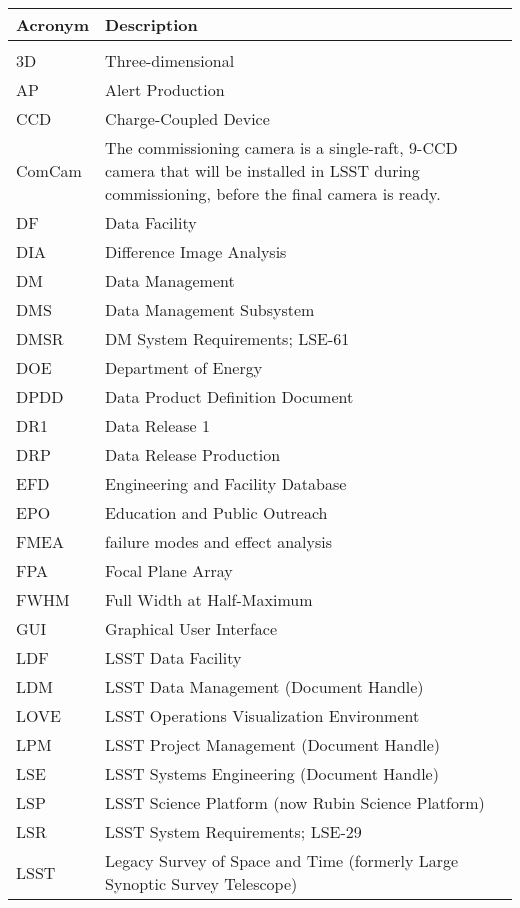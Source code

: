 \addtocounter{table}{-1}
\begin{longtable}{p{}p{}}\hline
\textbf{Acronym} & \textbf{Description}  \\\hline

 &  \\\hline
3D & Three-dimensional \\\hline
AP & Alert Production \\\hline
CCD & Charge-Coupled Device \\\hline
ComCam & The commissioning camera is a single-raft, 9-CCD camera that will be installed in LSST during commissioning, before the final camera is ready. \\\hline
DF & Data Facility \\\hline
DIA & Difference Image Analysis \\\hline
DM & Data Management \\\hline
DMS & Data Management Subsystem \\\hline
DMSR & DM System Requirements; LSE-61 \\\hline
DOE & Department of Energy \\\hline
DPDD & Data Product Definition Document \\\hline
DR1 & Data Release 1 \\\hline
DRP & Data Release Production \\\hline
EFD & Engineering and Facility Database \\\hline
EPO & Education and Public Outreach \\\hline
FMEA & failure modes and effect analysis \\\hline
FPA & Focal Plane Array \\\hline
FWHM & Full Width at Half-Maximum \\\hline
GUI & Graphical User Interface \\\hline
LDF & LSST Data Facility \\\hline
LDM & LSST Data Management (Document Handle) \\\hline
LOVE & LSST Operations Visualization Environment \\\hline
LPM & LSST Project Management (Document Handle) \\\hline
LSE & LSST Systems Engineering (Document Handle) \\\hline
LSP & LSST Science Platform (now Rubin Science Platform) \\\hline
LSR & LSST System Requirements; LSE-29 \\\hline
LSST & Legacy Survey of Space and Time (formerly Large Synoptic Survey Telescope) \\\hline

\end{longtable}
